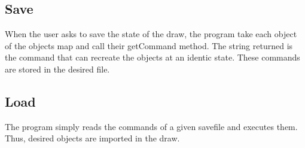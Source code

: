 \documentclass[a4paper, 12pts]{article}
\begin{document}
    \subsection{Save}
        When the user asks to save the state of the draw, the program take each object of the objects map and call their getCommand method.
        The string returned is the command that can recreate the objects at an identic state. These commands are stored in the desired file.
    \subsection{Load}
        The program simply reads the commands of a given savefile and executes them. Thus, desired objects are imported in the draw.
\end{document}
